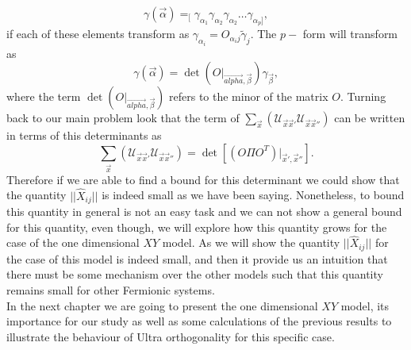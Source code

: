 \begin{equation}
\gamma(\vec{\alpha}) =_{[}\gamma_{\alpha_1}\gamma_{\alpha_2}\gamma_{\alpha_2}\ldots\gamma_{\alpha_p]},
\end{equation}
if each of these elements transform as $\gamma_{\alpha_i} = O_{\alpha_i j} \tilde{\gamma}_{j}$. The $p-$ form will transform as
\begin{equation}
\gamma(\vec{\alpha}) = \operatorname{det}\left(O\big|_{\vec{alpha},\vec{\beta}}\right)\gamma_{\vec{\beta}},
\label{CH2:transformations_of_operators}
\end{equation}
where the term $\operatorname{det}\left(O\big|_{\vec{alpha},\vec{\beta}}\right)$ refers to the minor of the matrix $O$. Turning back to our main problem look that the term of $\sum_{\vec{x}}\left(	\mathcal{U}_{\vec{x}\vec{x}'} \mathcal{U}_{\vec{x}\vec{x}''}\right)$ can be written in terms of this determinants as
\begin{equation}
\sum_{\vec{x}}\left(	\mathcal{U}_{\vec{x}\vec{x}'} \mathcal{U}_{\vec{x}\vec{x}''}\right) = \operatorname{det}\left[\left(O\Pi O^T\right)\big|_{\vec{x}',\vec{x}''}\right].
\label{CH2:Equation_to_find_bound}
\end{equation}
Therefore if we are able to find a bound for this determinant we could show that the quantity $||\hat{X}_{ij}||$ is indeed small as we have been saying. Nonetheless, to bound this quantity in general is not an easy task and we can not show a general bound for this quantity, even though, we will explore how this quantity grows for the case of the one dimensional $XY$ model. As we will show the quantity $||\hat{X}_{ij}||$ for the case of this model is indeed small, and then it provide us an intuition that there must be some mechanism over the other models such that this quantity remains small for other Fermionic systems.\\
In the next chapter we are going to present the one dimensional $XY$ model, its importance for our study as well as some calculations of the previous results to illustrate the behaviour of Ultra orthogonality for this specific case.






